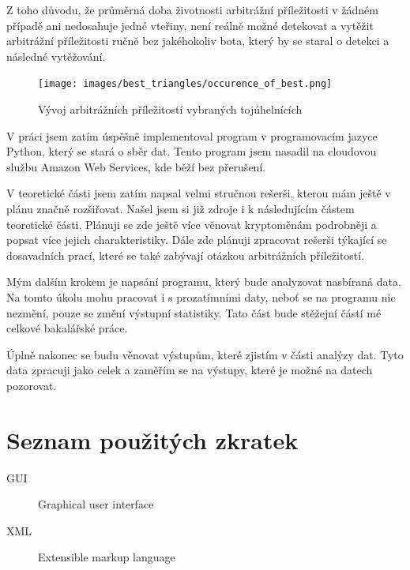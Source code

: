 \documentclass[thesis=B,czech]{FITthesis}[2019/03/21]
\begin{document}
Z toho důvodu, že průměrná doba životnosti arbitrážní příležitosti v žádném případě ani nedosahuje jedné vteřiny, není reálně možné detekovat a vytěžit arbitrážní příležitosti ručně bez jakéhokoliv bota, který by se staral o detekci a následné vytěžování. 


\begin{figure}\centering
	\texttt{[image: images/best\_triangles/occurence\_of\_best.png]}
	\caption{Vývoj arbitrážních příležitostí vybraných tojúhelnících }\label{occurence_of_best}
\end{figure}

\begin{conclusion}
V práci jsem zatím úspěšně implementoval program v programovacím jazyce Python, který se stará o sběr dat. Tento program jsem nasadil na cloudovou službu Amazon Web Services, kde běží bez přerušení. 

V teoretické části jsem zatím napsal velmi stručnou rešerši, kterou mám ještě v plánu značně rozšiřovat. Našel jsem si již zdroje i k následujícím částem teoretické části.  Plánuji se zde ještě více věnovat kryptoměnám podrobněji a popsat více jejich charakteristiky. Dále zde plánuji zpracovat rešerši týkající se dosavadních prací, které se také zabývají otázkou arbitrážních příležitostí.

Mým dalším krokem je napsání programu, který bude analyzovat nasbíraná data. Na tomto úkolu mohu pracovat i s prozatímními daty, neboť se na programu nic nezmění, pouze se změní výstupní statistiky. Tato část bude stěžejní částí mé celkové bakalářské práce.

Úplně nakonec se budu věnovat výstupům, které zjistím v části analýzy dat. Tyto data zpracuji jako celek a zaměřím se na výstupy, které je možné na datech pozorovat.


\end{conclusion}




\appendix

\chapter{Seznam použitých zkratek}
\begin{description}
	\item[GUI] Graphical user interface
	\item[XML] Extensible markup language
\end{description}
\end{document}
